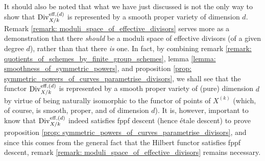         It should also be noted that what we have just discussed is not the only way to show that $\mathrm{Div}_{X/k}^{\mathrm{eff}, (d)}$ is represented by a smooth proper variety of dimension $d$. Remark \ref{remark: moduli_space_of_effective_divisors} serves more as a demonstration that there \textit{should} be a moduli space of effective divisors (of a given degree $d$), rather than that there \textit{is} one. In fact, by combining remark \ref{remark: quotients_of_schemes_by_finite_group_schemes}, lemma \ref{lemma: smoothness_of_symmetric_powers}, and proposition \ref{prop: symmetric_powers_of_curves_parametrise_divisors}, we shall see that the functor $\mathrm{Div}_{X/k}^{\mathrm{eff}, (d)}$ is represented by a smooth proper variety of (pure) dimension $d$ by virtue of being naturally isomorphic to the functor of points of $X^{(k)}$ (which, of course, is smooth, proper, and of dimension $d$). It is, however, important to know that $\mathrm{Div}_{X/k}^{\mathrm{eff}, (d)}$ indeed satisfies fppf descent (hence \'etale descent) to prove proposition \ref{prop: symmetric_powers_of_curves_parametrise_divisors}, and since this comes from the general fact that the Hilbert functor satisfies fppf descent, remark \ref{remark: moduli_space_of_effective_divisors} remains necessary. 
        
